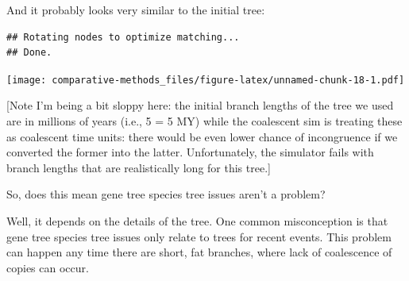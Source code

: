 \documentclass[]{book}
\newenvironment{Shaded}{\begin{snugshade}}{\end{snugshade}}
\newcommand{\KeywordTok}[1]{\textcolor[rgb]{0.13,0.29,0.53}{\textbf{{#1}}}}
\newcommand{\DecValTok}[1]{\textcolor[rgb]{0.00,0.00,0.81}{{#1}}}
\newcommand{\StringTok}[1]{\textcolor[rgb]{0.31,0.60,0.02}{{#1}}}
\newcommand{\NormalTok}[1]{{#1}}
\theoremstyle{definition}
\theoremstyle{definition}
\theoremstyle{remark}
\begin{document}
And it probably looks very similar to the initial tree:

\begin{Shaded}
\end{Shaded}

\begin{verbatim}
## Rotating nodes to optimize matching...
## Done.
\end{verbatim}

\texttt{[image: comparative-methods\_files/figure-latex/unnamed-chunk-18-1.pdf]}

{[}Note I'm being a bit sloppy here: the initial branch lengths of the
tree we used are in millions of years (i.e., 5 = 5 MY) while the
coalescent sim is treating these as coalescent time units: there would
be even lower chance of incongruence if we converted the former into the
latter. Unfortunately, the simulator fails with branch lengths that are
realistically long for this tree.{]}

So, does this mean gene tree species tree issues aren't a problem?

Well, it depends on the details of the tree. One common misconception is
that gene tree species tree issues only relate to trees for recent
events. This problem can happen any time there are short, fat branches,
where lack of coalescence of copies can occur.

\begin{Shaded}
\end{Shaded}
\end{document}
